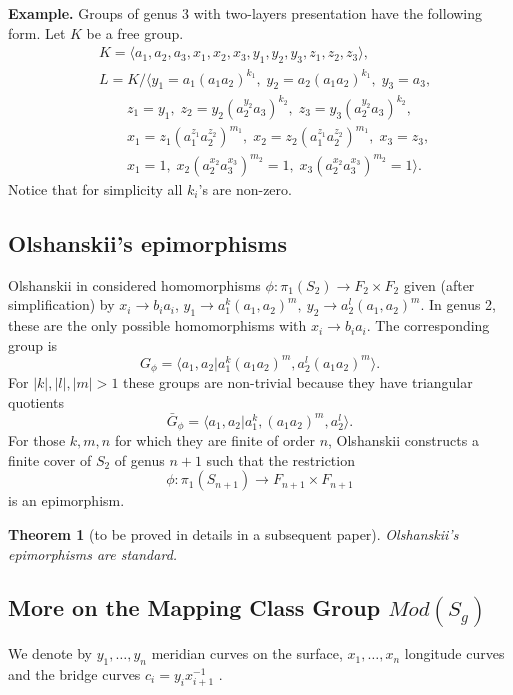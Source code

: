 \documentclass{article}
\newtheorem{theorem}{Theorem}[section]
\newcommand{\inv}{^{-1}}
\begin{document}
{\bf Example.} Groups of genus 3 with two-layers presentation have the following form. Let $K$ be a free group.
\[
\begin{aligned}
&K = \langle a_1,a_2,a_3,x_1,x_2,x_3,y_1,y_2,y_3,z_1,z_2,z_3 \rangle, \\[3pt]
&L = K \Big/ \Big\langle 
y_1 = a_1 (a_1 a_2)^{k_1},\;
 y_2 = a_2 (a_1 a_2)^{k_1},\;
 y_3 = a_3, \\[3pt]
&\qquad z_1 = y_1,\;
 z_2 = y_2 (a_2^{y_2} a_3)^{k_2},\;
 z_3 = y_3 (a_2^{y_2} a_3)^{k_2},\\[3pt]
&\qquad x_1 = z_1 (a_1^{z_1} a_2^{z_2})^{m_1},\;
 x_2 = z_2 (a_1^{z_1} a_2^{z_2})^{m_1},\;
 x_3 = z_3,\\[3pt]
&\qquad x_1 = 1,\;
 x_2 (a_2^{x_2} a_3^{x_3})^{m_2} = 1,\;
 x_3 (a_2^{x_2} a_3^{x_3})^{m_2} = 1
\Big\rangle.
\end{aligned}
\]
Notice that for simplicity all $k_i$'s are non-zero.

\subsection{Olshanskii's epimorphisms}

Olshanskii in \cite[Section 3]{Ol} considered homomorphisms $\phi :\pi _1(S_2)\rightarrow F_2\times F_2 $ given (after simplification) by
$x_i\rightarrow b_ia_i$, $y_1\rightarrow a_1^{k}(a_1,a_2)^m, \  y_2\rightarrow a_2^{l}(a_1,a_2)^m.$  In genus 2, these are the only possible homomorphisms with $x_i\rightarrow b_ia_i$. The corresponding group is $$G_{\phi}=\langle a_1,a_2| a_1^k(a_1a_2)^m,  a_2^l(a_1a_2)^m\rangle.$$  For $|k|,|l|,|m|>1$ these groups are non-trivial because they have triangular quotients $$\bar G_{\phi}=\langle a_1,a_2| a_1^k, (a_1a_2)^m,  a_2^l\rangle.$$  For those $k,m,n$ for which they are finite of order $n$, Olshanskii constructs a finite cover of $S_2$ of genus $n+1$ such that the restriction 
$$\phi:\pi_1(S_{n+1})\rightarrow F_{n+1}\times F_{n+1}$$ is an epimorphism.
\begin{theorem}[to be proved in details in a subsequent paper] Olshanskii's epimorphisms  are standard.
\end{theorem}


\subsection{More on the Mapping Class Group $Mod(S_g)$}
We denote by $y_1,\ldots ,y_n$ meridian curves on the surface,  $x_1,\ldots ,x_n$ longitude curves and the bridge curves $c_i=y_ix_{i+1}\inv$ . 
\end{document}

